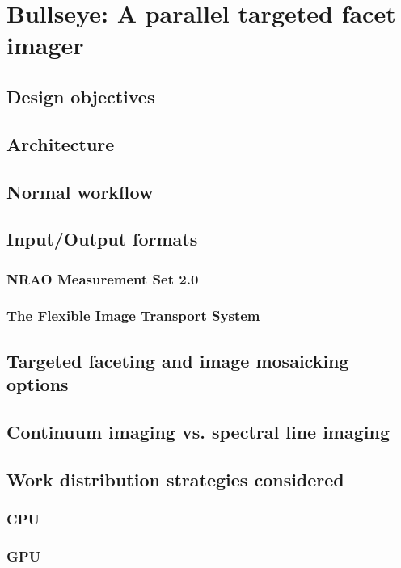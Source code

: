 \chapter{Bullseye: A parallel targeted facet imager}
\section{Design objectives}
\section{Architecture}
\section{Normal workflow}
\section{Input/Output formats}
\subsection{NRAO Measurement Set 2.0}
\subsection{The Flexible Image Transport System}
\section{Targeted faceting and image mosaicking options}
\section{Continuum imaging vs. spectral line imaging}
\section{Work distribution strategies considered}
\subsection{CPU}
\subsection{GPU}